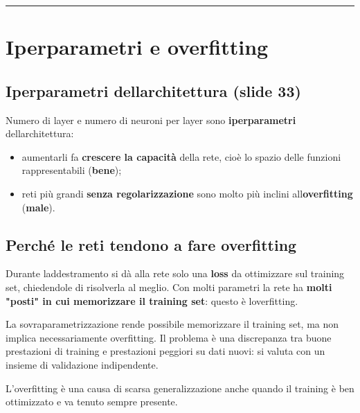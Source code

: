 \documentclass[11pt,a4paper,oneside,openany]{book}
\providecommand{\tightlist}{\setlength{\itemsep}{0pt}\setlength{\parskip}{0pt}}
\begin{document}
\begin{center}\rule{0.5\linewidth}{0.5pt}\end{center}

\section{Iperparametri e overfitting}\label{f01-r517}

\subsection{Iperparametri dell\textquotesingle architettura (slide 33)}\label{f01-r519}

Numero di layer e numero di neuroni per layer sono \textbf{iperparametri} dell\textquotesingle architettura:

\begin{itemize}
\tightlist
\item
  aumentarli fa \textbf{crescere la capacità} della rete, cioè lo spazio delle funzioni rappresentabili (\textbf{bene});
\item
  reti più grandi \textbf{senza regolarizzazione} sono molto più inclini all\textquotesingle{}\textbf{overfitting} (\textbf{male}).
\end{itemize}

\subsection{Perché le reti tendono a fare overfitting}\label{f01-r526}

Durante l\textquotesingle addestramento si dà alla rete solo una \textbf{loss} da ottimizzare sul training set, chiedendole di risolverla al meglio. Con molti parametri la rete ha \textbf{molti "posti" in cui memorizzare il training set}: questo è l\textquotesingle overfitting.

La sovraparametrizzazione rende possibile memorizzare il training set, ma non implica necessariamente overfitting. Il problema è una discrepanza tra buone prestazioni di training e prestazioni peggiori su dati nuovi: si valuta con un insieme di validazione indipendente.

L'overfitting è una causa di scarsa generalizzazione anche quando il training è ben ottimizzato e va tenuto sempre presente.
\end{document}
